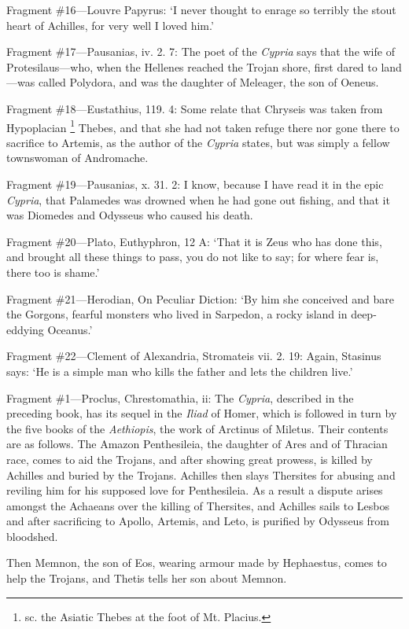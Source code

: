 Fragment \#16—Louvre Papyrus: ‘I never thought to enrage so terribly
the stout heart of Achilles, for very well I loved him.’

Fragment \#17—Pausanias, iv. 2. 7: The poet of the \emph{Cypria}
says that the wife of Protesilaus—who, when the Hellenes reached the
Trojan shore, first dared to land—was called Polydora, and was the
daughter of Meleager, the son of Oeneus.

Fragment \#18—Eustathius, 119. 4: Some relate that Chryseis was taken from
Hypoplacian \footnote{sc. the Asiatic Thebes at
the foot of Mt. Placius.} Thebes, and that she had not
taken refuge there nor gone there to sacrifice to Artemis, as the author of the
\emph{Cypria} states, but was simply a fellow townswoman of Andromache.

Fragment \#19—Pausanias, x. 31. 2: I know, because I have read it in the
epic \emph{Cypria}, that Palamedes was drowned when he had gone out
fishing, and that it was Diomedes and Odysseus who caused his death.

Fragment \#20—Plato, Euthyphron, 12 A: ‘That it is Zeus who has done
this, and brought all these things to pass, you do not like to say; for where
fear is, there too is shame.’

Fragment \#21—Herodian, On Peculiar Diction: ‘By him she conceived
and bare the Gorgons, fearful monsters who lived in Sarpedon, a rocky island in
deep-eddying Oceanus.’

Fragment \#22—Clement of Alexandria, Stromateis vii. 2. 19: Again,
Stasinus says: ‘He is a simple man who kills the father and lets the
children live.’


Fragment \#1—Proclus, Chrestomathia, ii: The \emph{Cypria},
described in the preceding book, has its sequel in the \emph{Iliad} of
Homer, which is followed in turn by the five books of the
\emph{Aethiopis}, the work of Arctinus of Miletus. Their contents are as
follows. The Amazon Penthesileia, the daughter of Ares and of Thracian race,
comes to aid the Trojans, and after showing great prowess, is killed by
Achilles and buried by the Trojans. Achilles then slays Thersites for abusing
and reviling him for his supposed love for Penthesileia. As a result a dispute
arises amongst the Achaeans over the killing of Thersites, and Achilles sails
to Lesbos and after sacrificing to Apollo, Artemis, and Leto, is purified by
Odysseus from bloodshed.

Then Memnon, the son of Eos, wearing armour made by Hephaestus, comes to help
the Trojans, and Thetis tells her son about Memnon.

